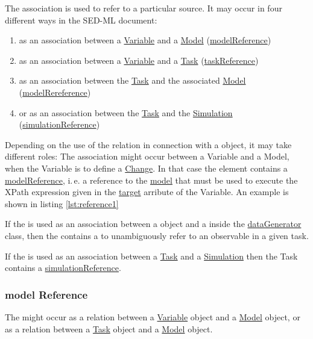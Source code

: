 \label{sec:reference}

The  association is used to refer to a particular source. It may occur in four different ways in the SED-ML document:
\begin{enumerate}
\item{as an association between a \hyperref[class:variable]{Variable} and a \hyperref[class:Model]{Model} (\hyperref[sec:modelReference]{modelReference})}
\item{as an association between a \hyperref[class:variable]{Variable} and a \hyperref[class:task]{Task} (\hyperref[sec:taskReference]{taskReference})}
\item{as an association between the \hyperref[class:Task]{Task} and the associated \hyperref[class:Model]{Model} (\hyperref[sec:modelReference]{modelRereference})}
\item{or as an association between the \hyperref[class:Task]{Task} and the \hyperref[class:Simulation]{Simulation} (\hyperref[sec:simulationReference]{simulationReference})}
\end{enumerate}


Depending on the use of the  relation in connection with a  object, it may take different roles: 
The  association might occur between a Variable and a Model, when the Variable is to define a \hyperref[class:change]{Change}. In that case the  element contains a \hyperref[class:modelReference]{modelReference}, i.\,e. a reference to the \hyperref[class:model]{model} that must be used to execute the XPath expression given in the \hyperref[class:target]{target} arribute of the Variable. An example is shown in listing \ref{lst:reference1}

If the  is used as an association between a  object and a  inside the \hyperref[class:dataGenerator]{dataGenerator} class, then the  contains a  to unambiguously refer to an observable in a given task. 

If the  is used as an association between a \hyperref[class:task]{Task} and a \hyperref[class:simulation]{Simulation} then the Task contains a \hyperref[sec:simulationReference]{simulationReference}.

\subsubsection{model Reference}
\label{sec:modelReference}
%
The  might occur as a relation between a \hyperref[class:variable]{Variable} object and a \hyperref[class:Model]{Model} object, or as a relation between a \hyperref[class:Task]{Task} object and a \hyperref[class:Model]{Model} object.

